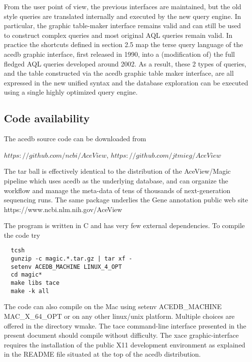 \documentclass[11pt]{article}
\newcommand{\BL}{\begin{lstlisting}}
\begin{document}
From the user point of view, the previous interfaces are maintained, but the old style queries are translated internally and executed by the new query engine. In particular, the graphic table-maker interface remains valid and can still be used to construct complex queries and most original AQL queries remain valid. In practice the shortcuts 
defined in section 2.5 map the terse query language of the acedb graphic interface, first released in 1990, into a (modification of) the full fledged 
AQL queries developed around 2002. As a result, these 2 types of queries, and the table constructed via the acedb graphic table 
maker interface, are all expressed in the new unified syntax and the database exploration can be executed using a single highly optimized query engine.


%%%%%%%%%%%%%%%%%%%%%%%%%%%%%%%%%%%%%%%%%%%%%%%%%%%%%%%%%%%%%%%%
% SECTION
%%%%%%%%%%%%%%%%%%%%%%%%%%%%%%%%%%%%%%%%%%%%%%%%%%%%%%%%%%%%%%%%
\subsection {Code availability}

The acedb source code can be downloaded from 
 
$https://github.com/ncbi/AceView$, $https://github.com/jtmieg/AceView$ 

The tar ball is effectively identical to the distribution of the AceView/Magic pipeline 
\cite{DJTM} which uses acedb as the underlying database, and can organize the workflow and manage the
meta-data of tens of thousands of next-generation sequencing runs. The same package
underlies the Gene annotation public web site https://www.ncbi.nlm.nih.gov/AceView \cite{cDNA}

The program is written in C and has very few external dependencies. To compile the code try
\BL
  tcsh 
  gunzip -c magic.*.tar.gz | tar xf -
  setenv ACEDB_MACHINE LINUX_4_OPT
  cd magic*
  make libs tace
  make -k all
\end{lstlisting}
 
The code can also compile on the Mac using 
setenv ACEDB\_MACHINE  MAC\_X\_64\_OPT
or on any other linux/unix platform. Multiple choices are offered in the directory wmake.
The tace command-line interface presented in the present document
should compile without difficulty.
The xace graphic-interface requires 
the installation of the public X11 development environment
as explained in the README file situated at the top of the acedb distribution.
\end{document}
